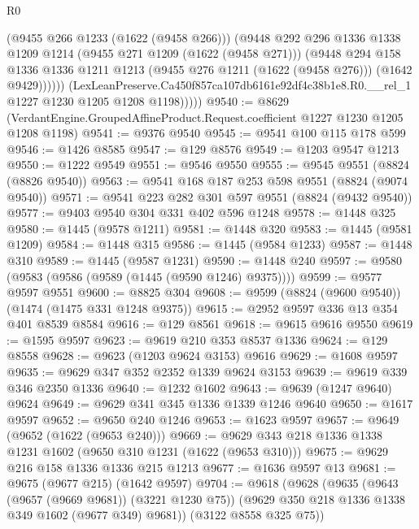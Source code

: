 \begin{lexlean}{R0}
\begin{coremodule}
                  (@9455 @266 @1233 (@1622 (@9458 @266)))
                  (@9448
                    @292
                    @296
                    @1336
                    @1338
                    @1209
                    @1214
                    (@9455 @271 @1209 (@1622 (@9458 @271)))
                    (@9448
                      @294
                      @158
                      @1336
                      @1336
                      @1211
                      @1213
                      (@9455 @276 @1211 (@1622 (@9458 @276)))
                      (@1642 @9429))))))
            (LexLeanPreserve.Ca450f857ca107db6161e92df4c38b1e8.R0.__rel_1
              @1227
              @1230
              @1205
              @1208
              @1198)))))
@9540 := @8629
    (VerdantEngine.GroupedAffineProduct.Request.coefficient @1227 @1230 @1205 @1208 @1198)
@9541 := @9376 @9540
@9545 := @9541 @100 @115 @178 @599
@9546 := @1426 @8585
@9547 := @129 @8576
@9549 := @1203 @9547 @1213
@9550 := @1222 @9549
@9551 := @9546 @9550
@9555 := @9545 @9551 (@8824 (@8826 @9540))
@9563 := @9541 @168 @187 @253 @598 @9551 (@8824 (@9074 @9540))
@9571 := @9541 @223 @282 @301 @597 @9551 (@8824 (@9432 @9540))
@9577 := @9403 @9540 @304 @331 @402 @596 @1248
@9578 := @1448 @325
@9580 := @1445 (@9578 @1211)
@9581 := @1448 @320
@9583 := @1445 (@9581 @1209)
@9584 := @1448 @315
@9586 := @1445 (@9584 @1233)
@9587 := @1448 @310
@9589 := @1445 (@9587 @1231)
@9590 := @1448 @240
@9597 := @9580 (@9583 (@9586 (@9589 (@1445 (@9590 @1246) @9375))))
@9599 := @9577 @9597 @9551
@9600 := @8825 @304
@9608 := @9599 (@8824 (@9600 @9540)) (@1474 (@1475 @331 @1248 @9375))
@9615 := @2952 @9597 @336 @13 @354 @401 @8539 @8584
@9616 := @129 @8561
@9618 := @9615 @9616 @9550
@9619 := @1595 @9597
@9623 := @9619 @210 @353 @8537 @1336
@9624 := @129 @8558
@9628 := @9623 (@1203 @9624 @3153) @9616
@9629 := @1608 @9597
@9635 := @9629 @347 @352 @2352 @1339 @9624 @3153
@9639 := @9619 @339 @346 @2350 @1336
@9640 := @1232 @1602
@9643 := @9639 (@1247 @9640) @9624
@9649 := @9629 @341 @345 @1336 @1339 @1246 @9640
@9650 := @1617 @9597
@9652 := @9650 @240 @1246
@9653 := @1623 @9597
@9657 := @9649 (@9652 (@1622 (@9653 @240)))
@9669 := @9629 @343 @218 @1336 @1338 @1231 @1602 (@9650 @310 @1231 (@1622 (@9653 @310)))
@9675 := @9629 @216 @158 @1336 @1336 @215 @1213
@9677 := @1636 @9597 @13
@9681 := @9675 (@9677 @215) (@1642 @9597)
@9704 := @9618
    (@9628
      (@9635
        (@9643 (@9657 (@9669 @9681)) (@3221 @1230 @75))
        (@9629 @350 @218 @1336 @1338 @349 @1602 (@9677 @349) @9681))
      (@3122 @8558 @325 @75))

\end{coremodule}
\end{lexlean}
